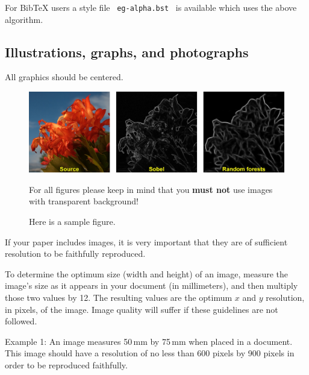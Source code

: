 \documentclass{egpubl}
\begin{document}
For BibTeX users a style file \ \texttt{eg-alpha.bst} \ is available which
uses the above algorithm.

\subsection{Illustrations, graphs, and photographs}

All graphics should be centered.

\begin{figure}[htb]
  \centering
  \includegraphics[width=.8\linewidth]{figs/01.jpg}
  \parbox[t]{.9\columnwidth}{\relax
           For all figures please keep in mind that you \textbf{must not}
           use images with transparent background!
           }
  \caption{\label{fig:firstExample}
           Here is a sample figure.}
\end{figure}

If your paper includes images, it is very important that they are of
sufficient resolution to be faithfully reproduced.

To determine the optimum size (width and height) of an image, measure
the image's size as it appears in your document (in millimeters), and
then multiply those two values by 12. The resulting values are the
optimum $x$ and $y$ resolution, in pixels, of the image. Image quality
will suffer if these guidelines are not followed.

Example 1:
%
An image measures 50\,mm by 75\,mm when placed in a document. This
image should have a resolution of no less than 600 pixels by 900
pixels in order to be reproduced faithfully.
\end{document}
